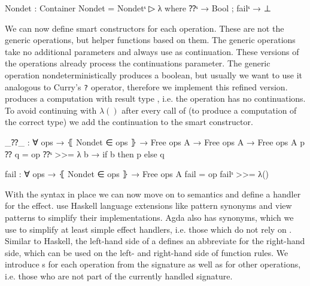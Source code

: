 \begin{code}
Nondet : Container
Nondet = Nondetˢ ▷ λ where ⁇ˢ → Bool ; failˢ → ⊥
\end{code}
We can now define smart constructors for each operation.
These are not the generic operations, but helper functions based on them.
The generic operations take no additional parameters and always use
 as continuation.
These versions of the operations already process the continuations parameter.
The generic  operation nondeterministically produces a boolean,
but usually we want to use it analogous to Curry's \texttt{?} operator,
therefore we implement this refined version.
\AgdaSpace{} produces a
computation with result type , i.e. the operation has no
continuations.
To avoid continuing with $λ()$ after every call of  (to
produce a computation of the correct type) we add the continuation to the smart
constructor.

\begin{code}
_⁇_ : ∀ {ops} → ⦃ Nondet ∈ ops ⦄ → Free ops A → Free ops A → Free ops A
p ⁇ q = op ⁇ˢ >>= λ b → if b then p else q

fail : ∀ {ops} → ⦃ Nondet ∈ ops ⦄ → Free ops A
fail = op failˢ >>= λ()
\end{code}
With the syntax in place we can now move on to semantics and define a handler
for the effect.
\textcite{DBLP:conf/haskell/WuSH14} use Haskell language extensions like pattern
synonyms and view patterns to simplify their implementations.
Agda also has  synonyms, which we use to simplify at least
simple effect handlers, i.e. those which do not rely on .
Similar to Haskell, the left-hand side of a  defines an
abbreviate for the right-hand side, which can be used on the left- and
right-hand side of function rules.
We introduce s for each operation from the signature as
well as for other operations, i.e. those who are not part of the currently
handled signature.

